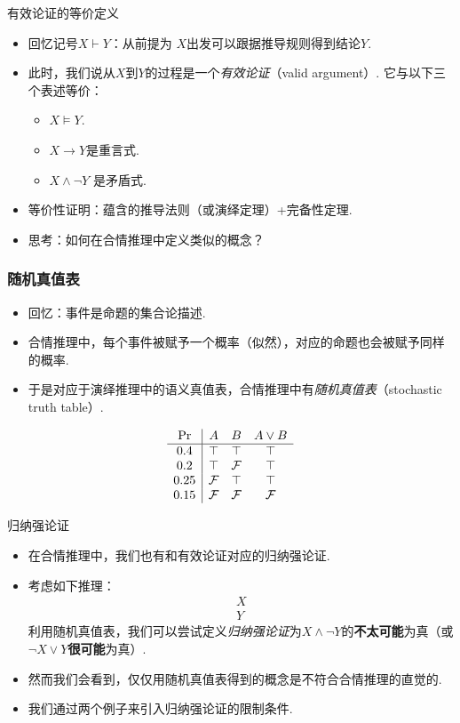 \begin{frame}{有效论证的等价定义}
\begin{itemize}
    \item 回忆记号$X\vdash Y$：从前提为 $X$出发可以跟据推导规则得到结论$Y$.
    \item 此时，我们说从$X$到$Y$的过程是一个\emph{有效论证}（valid argument）. 它与以下三个表述等价：
    \begin{itemize}
        \item $X\models Y$.
        \item  $X\to Y$是重言式.
        \item $X\wedge \lnot Y$ 是矛盾式.
    \end{itemize}
    \item 等价性证明：蕴含的推导法则（或演绎定理）+完备性定理.
    \item 思考：如何在合情推理中定义类似的概念？
 \end{itemize}
\end{frame}

\begin{frame}
    \frametitle{随机真值表}
    \begin{itemize}
        \item 回忆：事件是命题的集合论描述.
        \item 合情推理中，每个事件被赋予一个概率（似然），对应的命题也会被赋予同样的概率.
        \item 于是对应于演绎推理中的语义真值表，合情推理中有\emph{随机真值表}（stochastic truth table）.
    \end{itemize}
    \[
    \begin{array}{c|ccc}
        \Pr & A & B & A\vee B \\ \hline
        0.4 & \top & \top & \top \\ 
        0.2 & \top & \mathcal{F} & \top \\ 
        0.25 & \mathcal{F} & \top & \top \\
        0.15 & \mathcal{F} & \mathcal{F} & \mathcal{F} \\
    \end{array}\]
\end{frame}


\begin{frame}{归纳强论证}
	\begin{itemize}
	\item     在合情推理中，我们也有和有效论证对应的归纳强论证.
	\item 考虑如下推理：
	\[\begin{array}{c}
	     X\\\hline
	     Y
	\end{array}\]
	利用随机真值表，我们可以尝试定义\emph{归纳强论证}为$X\wedge\neg Y$的\textbf{不太可能}为真（或$\neg X\vee Y$\textbf{很可能}为真）.
	\item 然而我们会看到，仅仅用随机真值表得到的概念是不符合合情推理的直觉的.
	\item 我们通过两个例子来引入归纳强论证的限制条件.
	\end{itemize}
\end{frame}

